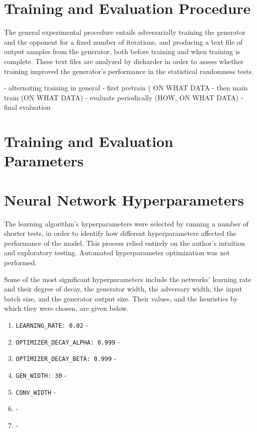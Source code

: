 \documentclass[12pt, titlepage]{report}
\theoremstyle{definition}
\begin{document}
\section{Training and Evaluation Procedure}
The general experimental procedure entails adversarially training the generator and the opponent for a fixed number of iterations, and producing a text file of output samples from the generator, both before training and when training is complete. These text files are analyzed by dieharder in order to assess whether training improved the generator's performance in the statistical randomness tests.



- alternating training in general
- first pretrain ( ON WHAT DATA
- then main train (ON WHAT DATA)
- evaluate periodically (HOW, ON WHAT DATA)
- final evaluation

\section{Training and Evaluation Parameters}


\section{Neural Network Hyperparameters}
The learning algorithm's hyperparameters were selected by running a number of shorter tests, in order to identify how different hyperparameters affected the performance of the model. This process relied entirely on the author's intuition and exploratory testing. Automated hyperparameter optimization was not performed.

Some of the most significant hyperparameters include the networks' learning rate and their degree of decay, the generator width, the adversary width, the input batch size, and the generator output size. Their values, and the heuristics by which they were chosen, are given below.

\begin{enumerate}
\item \texttt{LEARNING_RATE: 0.02} - 
\item \texttt{OPTIMIZER_DECAY_ALPHA: 0.999} - 
\item \texttt{OPTIMIZER_DECAY_BETA: 0.999} - 
\item \texttt{GEN_WIDTH: 30} - 
\item \texttt{CONV_WIDTH} - 
\item \texttt{} - 
\item \texttt{} - 
\end{enumerate}
\end{document}
